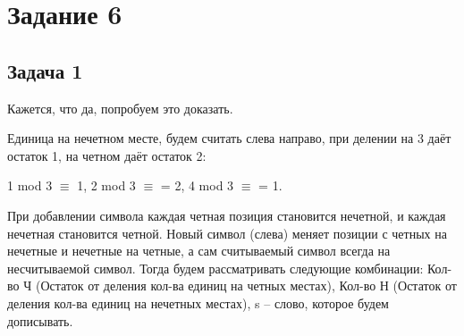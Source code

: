\documentclass[a4paper,14pt]{article} %
\begin{document}

\section{Задание 6}
\subsection{Задача 1}
Кажется, что да, попробуем это доказать.

Единица на нечетном месте, будем считать слева направо, при делении на 3 даёт остаток 1, на четном даёт остаток 2:

1 mod 3 $\equiv$ 1, 2 mod 3 $\equiv$ = 2, 4 mod 3 $\equiv$ = 1.

При добавлении символа каждая четная позиция становится нечетной, и каждая нечетная становится четной. 
Новый символ (слева) меняет позиции с четных на нечетные и нечетные на четные, а сам считываемый символ всегда на несчитываемой символ.
Тогда будем рассматривать следующие комбинации:
Кол-во Ч (Остаток от деления кол-ва единиц на четных местах),
Кол-во Н (Остаток от деления кол-ва единиц на нечетных местах),
s -- слово, которое будем дописывать.
\end{document}
